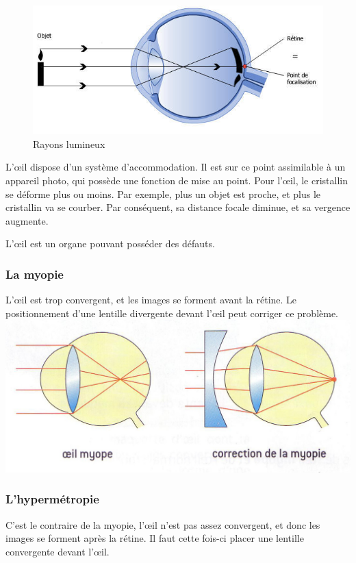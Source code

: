 \documentclass[a4paper, 12pt, onecolumn, openany]{report}
\begin{document}
	\begin{figure}[h]
	\begin{center}
	\includegraphics[scale=0.2]{rayons_lumineux.jpg}
	\end{center}
	\caption{Rayons lumineux}
	\label{Rayons lumineux}
	\end{figure}
		
	L’œil dispose d’un système d’accommodation. Il est sur ce point assimilable à un appareil photo, qui possède une fonction de mise au point. Pour l’œil, le cristallin se déforme plus ou moins. Par exemple, plus un objet est proche, et plus le cristallin va se courber. Par conséquent, sa distance focale diminue, et sa vergence augmente. 

	L’œil est un organe pouvant posséder des défauts.

	\subsubsection{La myopie}
	L’œil est trop convergent, et les images se forment avant la rétine. Le positionnement d’une lentille divergente devant l’œil peut corriger ce problème.
	\includegraphics{myopie.jpg}
	
	\subsubsection{L'hypermétropie}
	C’est le contraire de la myopie, l’œil n’est pas assez convergent, et donc les images se forment après la rétine. Il faut cette fois-ci placer une lentille convergente devant l’œil.
	
\end{document}
